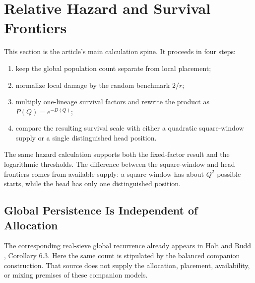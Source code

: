 \section{Relative Hazard and Survival Frontiers}
This section is the article's main calculation spine. It proceeds in four
steps:
\begin{enumerate}
  \item keep the global population count separate from local placement;
  \item normalize local damage by the random benchmark $2/r$;
  \item multiply one-lineage survival factors and rewrite the product as
    $P(Q)=e^{-D(Q)}$;
  \item compare the resulting survival scale with either a quadratic
    square-window supply or a single distinguished head position.
\end{enumerate}
The same hazard calculation supports both the fixed-factor result and the
logarithmic thresholds. The difference between the square-window and head
frontiers comes from available supply: a square window has about $Q^2$
possible starts, while the head has only one distinguished position.

\subsection{Global Persistence Is Independent of Allocation}
The corresponding real-sieve global recurrence already appears in Holt and Rudd \cite{holtrudd2014}, Corollary 6.3. Here the same count is stipulated by the balanced companion construction. That source does not supply the allocation, placement, availability, or mixing premises of these companion models.

